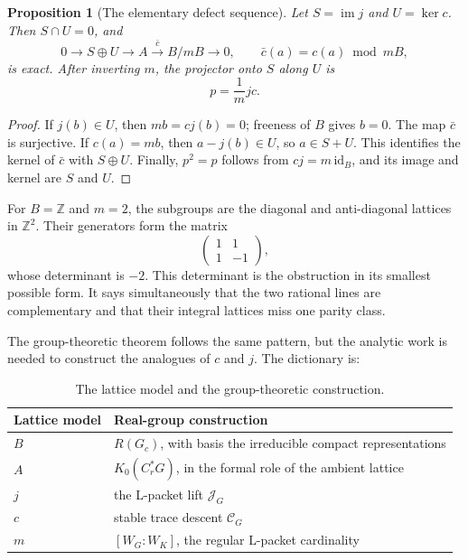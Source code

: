 \documentclass[11pt]{amsart}
\newtheorem{proposition}[theorem]{Proposition}
\theoremstyle{definition}
\theoremstyle{remark}
\begin{document}
\begin{proposition}[The elementary defect sequence]\label{prop:lattice-model}
Let \(S=\operatorname{im}j\) and \(U=\ker c\).  Then \(S\cap U=0\), and
\[
  0\longrightarrow S\oplus U\longrightarrow A
  \overset{\bar c}{\longrightarrow}B/mB\longrightarrow0,
  \qquad
  \bar c(a)=c(a)\bmod mB,
\]
is exact.  After inverting \(m\), the projector onto \(S\) along \(U\) is
\[
  p=\frac1m jc.
\]
\end{proposition}

\begin{proof}
If \(j(b)\in U\), then \(mb=cj(b)=0\); freeness of \(B\) gives \(b=0\).
The map \(\bar c\) is surjective.  If \(c(a)=mb\), then
\(a-j(b)\in U\), so \(a\in S+U\).  This identifies the kernel of
\(\bar c\) with \(S\oplus U\).  Finally, \(p^2=p\) follows from
\(cj=m\,\mathrm{id}_B\), and its image and kernel are \(S\) and \(U\).
\end{proof}

For \(B=\mathbb Z\) and \(m=2\), the subgroups are the diagonal and
anti-diagonal lattices in \(\mathbb Z^2\).  Their generators form the matrix
\[
  \begin{pmatrix}1&1\\[2pt]1&-1\end{pmatrix},
\]
whose determinant is \(-2\).  This determinant is the obstruction in its
smallest possible form.  It says simultaneously that the two rational lines
are complementary and that their integral lattices miss one parity class.

The group-theoretic theorem follows the same pattern, but the analytic work is
needed to construct the analogues of \(c\) and \(j\).  The dictionary is:
\begin{table}[H]
\centering
\small
\renewcommand{\arraystretch}{1.15}
\caption{The lattice model and the group-theoretic construction.}
\label{tab:lattice-dictionary}
\begin{tabular}{@{}p{}p{}@{}}
\toprule
Lattice model & Real-group construction\\
\midrule
\(B\) & \(R(G_c)\), with basis the irreducible compact representations\\
\(A\) & \(K_0(C_r^*G)\), in the formal role of the ambient lattice\\
\(j\) & the L-packet lift \(\mathcal J_G\)\\
\(c\) & stable trace descent \(\mathcal C_G\)\\
\(m\) & \([W_G:W_K]\), the regular L-packet cardinality\\
\bottomrule
\end{tabular}
\end{table}
\end{document}
